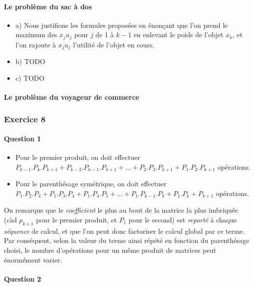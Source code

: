 \documentclass[a4paper, 12pt]{article}
\begin{document}
\paragraph{Le problème du sac à dos}
\begin{itemize}
\item a) Nous justifions les formules proposées en énonçant que l'on
  prend le maximum des $x_ju_j$ pour $j$ de 1 à $k-1$ en enlevant le
  poids de l'objet $x_k$, et l'on rajoute à $x_ju_j$ l'utilité de
  l'objet en cours.
\item b) TODO
\item c) TODO
\end{itemize}

\paragraph{Le problème du voyageur de commerce}

\subsubsection*{Exercice 8}

\paragraph{Question 1}

\begin{itemize}
\item Pour le premier produit, on doit effectuer $P_{k-1}.P_k.P_{k+1}
  + P_{k-2}.P_{k-1}.P_{k+1} + \dots + P_2.P_3.P_{k+1} + P_1.P_2.P_{k+1}$ opérations.
\item Pour le parenthésage symétrique, on doit effectuer $P_1.P_2.P_3
  + P_1.P_3.P_4 + P_1.P_4.P_5 + \dots + P_1.P_{k-1}.P_{k} + P_1.P_k+P_{k+1}$ opérations.
\end{itemize}

On remarque que le \textit{coefficient} le plus au bout de la matrice
la plus imbriquée (càd $p_{k+1}$ pour le premier produit, et $P_1$
pour le second) est \textit{reporté} à chaque \textit{séquence} de
calcul, et que l'on peut donc factoriser le calcul global par ce
terme. Par conséquent, selon la valeur du terme ainsi répété en
fonction du parenthésage choisi, le nombre d'opérations pour un même
produit de matrices peut énormément varier.

\paragraph{Question 2}
\end{document}
